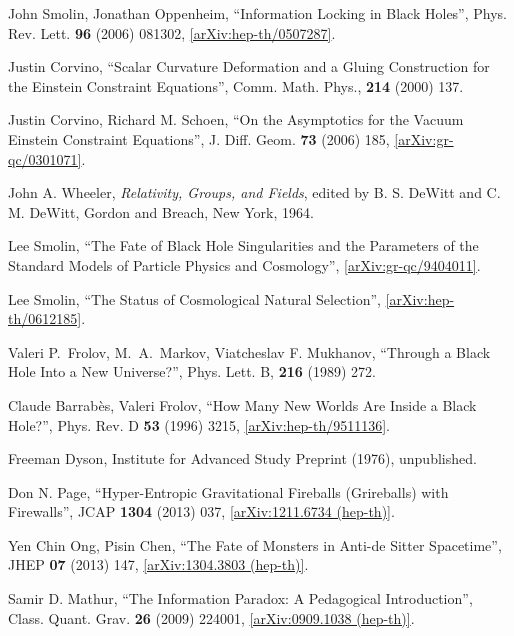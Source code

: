 \documentclass[12pt]{article}
\newcommand{\2}{$^2$}
\newcommand{\3}{$^3$}
\newcommand{\4}{$_4$}
\newcommand{\5}{$_5$}
\begin{document}
\begin{thebibliography}{400}
John Smolin, Jonathan Oppenheim, ``Information Locking in Black Holes'', Phys. Rev. Lett. \textbf{96} (2006) 081302, \href{http://arxiv.org/abs/hep-th/0507287}{[arXiv:hep-th/0507287]}.

 Justin Corvino, ``Scalar Curvature Deformation and a Gluing Construction for the Einstein Constraint Equations'', 
Comm. Math. Phys., \textbf{214} (2000) 137.

Justin Corvino, Richard M. Schoen, ``On the Asymptotics for the Vacuum Einstein Constraint Equations'',  J. Diff. Geom. \textbf{73} (2006) 185, \href{http://arxiv.org/abs/gr-qc/0301071}{[arXiv:gr-qc/0301071]}.



John A. Wheeler, \emph{Relativity, Groups, and Fields}, edited by B. S. DeWitt and C. M. DeWitt, Gordon and Breach, New York, 1964.

Lee Smolin, ``The Fate of Black Hole Singularities and the Parameters of the Standard Models of Particle Physics and Cosmology'',  \href{http://arxiv.org/abs/gr-qc/9404011}{[arXiv:gr-qc/9404011]}.


Lee Smolin, ``The Status of Cosmological Natural Selection'', \href{http://arxiv.org/abs/hep-th/0612185}{[arXiv:hep-th/0612185]}.

 Valeri P.~Frolov, M.~A.~Markov, Viatcheslav F. Mukhanov, ``Through a Black Hole Into a New Universe?'', Phys. Lett. B, \textbf{216} (1989) 272.

Claude Barrab\`es, Valeri Frolov, ``How Many New Worlds Are Inside a Black Hole?'', Phys. Rev. D \textbf{53} (1996) 3215, \href{http://arxiv.org/abs/hep-th/9511136v1}{[arXiv:hep-th/9511136]}.


Freeman Dyson, Institute for Advanced Study Preprint (1976), unpublished.

Don N. Page, ``Hyper-Entropic Gravitational Fireballs (Grireballs) with Firewalls'', JCAP \textbf{1304} (2013) 037, \href{http://arxiv.org/abs/1211.6734}{[arXiv:1211.6734 (hep-th)]}.


 Yen Chin Ong, Pisin Chen, ``The Fate of Monsters in Anti-de Sitter Spacetime'', JHEP \textbf{07} (2013) 147, \href{http://arxiv.org/abs/1304.3803}{[arXiv:1304.3803 (hep-th)]}.

Samir D. Mathur, ``The Information Paradox: A Pedagogical Introduction'', Class. Quant. Grav. \textbf{26} (2009) 224001, \href{http://arxiv.org/abs/0909.1038}{[arXiv:0909.1038 (hep-th)]}.


\end{thebibliography}
\end{document}
